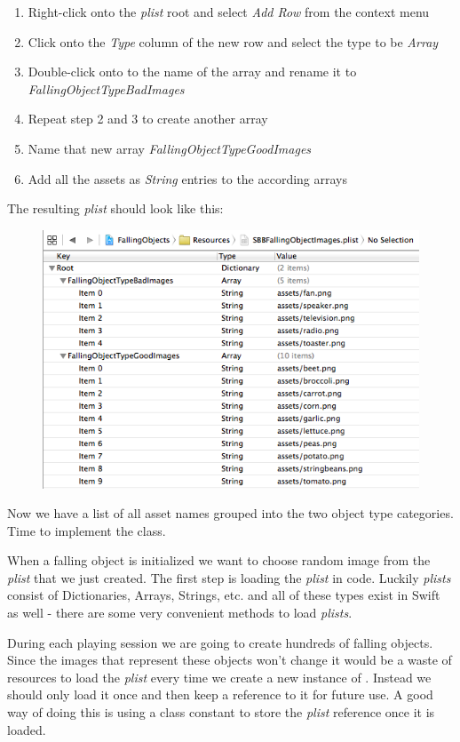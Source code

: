 \begin{leftbar}
\begin{enumerate}
  \item Right-click onto the \textit{plist} root and select \textit{Add Row}
  from the context menu
  \item Click onto the \textit{Type} column of the new row and select the type
  to be \textit{Array}
  \item Double-click onto to the name of the array and rename it to
  \textit{FallingObjectTypeBadImages}
  \item Repeat step 2 and 3 to create another array
  \item Name that new array \textit{FallingObjectTypeGoodImages}
  \item Add all the assets as \textit{String} entries to the according arrays
\end{enumerate}
The resulting \textit{plist} should look like this:
\begin{figure}[H]
    \centering
    \includegraphics[width=0.7\linewidth]{images/Chapter2/plist_setup.png}
\end{figure}
\end{leftbar}

Now we have a list of all asset names grouped into the two object type
categories. Time to implement the  class.

When a falling object is initialized we want to
choose random image from the \textit{plist} that we just created.
The first step is loading the \textit{plist} in code. Luckily \textit{plists}
consist of Dictionaries, Arrays, Strings, etc. and all of these types exist in
Swift as well - there are some very convenient methods to load
\textit{plists}. 

During each playing session we are going to create hundreds of
falling objects. Since the images that represent these objects won't change it
would be a waste of resources to load the \textit{plist} every time we create a
new instance of . Instead we should only load it
once and then keep a reference to it for future use. A good way of doing this is
using a class constant to store the \textit{plist} reference once it is loaded.


